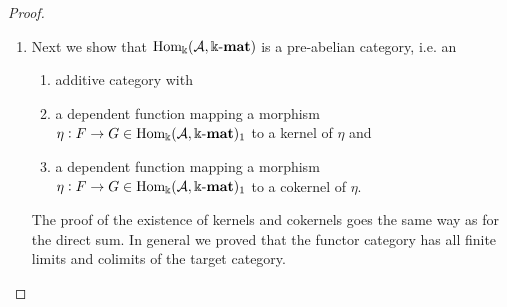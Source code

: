\begin{proof}
\begin{enumerate}
\item Next we show that $\mathrm{Hom_{\Bbbk}}(\mathcal{A},\Bbbk\textnormal{-}\mathbf{mat})$ is a pre-abelian category, i.e. an
\begin{enumerate}
\renewcommand{\labelenumii}{(\roman{enumii})}
\item additive category with
\item a dependent function mapping a morphism $\eta : F \rightarrow G \in \mathrm{Hom_{\Bbbk}}(\mathcal{A},\Bbbk\textnormal{-}\mathbf{mat})_{1}$ to a kernel of $\eta$ and
\item a dependent function mapping a morphism $\eta : F \rightarrow G \in \mathrm{Hom_{\Bbbk}}(\mathcal{A},\Bbbk\textnormal{-}\mathbf{mat})_{1}$ to a cokernel of $\eta$.
\end{enumerate}
The proof of the existence of kernels and cokernels goes the same way as for the direct sum. In general we proved that the functor category
has all finite limits and colimits of the target category.


\end{enumerate}
\end{proof}
